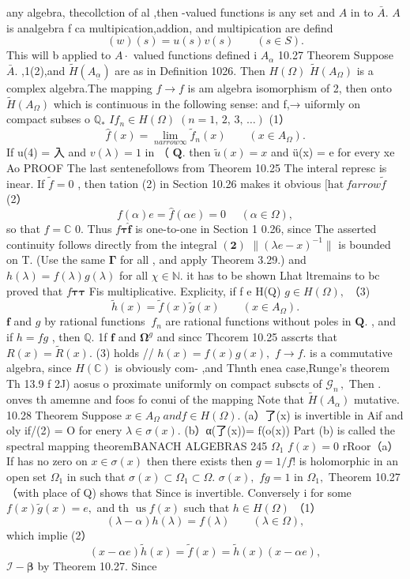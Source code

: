any algebra, thecollction of al ,then -valued functions is any set and $\textstyle A$ in to ${\bar{A}}.$ $\textstyle A$ is analgebra f ca multipication,addion, and multipication are defind $$ (w)(s)=u(s)v(s)\qquad(s\in S). $$ This will b applied to $A\!\cdot\!$ valued functions defined i $\scriptstyle A_{\alpha}$ 10.27 Theorem Suppose ${\bar{A}}.$ ,1(2),and ${\widetilde{H}}(A_{\underline{{{\alpha}}}})$ are as in Definition 1026. Then $H(\Omega)$ ${\tilde{H}}(A_{\Omega})$ is a complex algebra.The mapping $f\to f$ is am algebra isomorphism of 2, then onto ${\tilde{H}}(A_{\Omega})$ which is continuous in the following sense: and f,→ uiformly on compact subses o $\mathbb{Q}_{*}$ $I f_{n}\in H(\Omega)\;(n=1,\,2,\,3,\,\ldots)$ (1） $$ \hat{f}(x)=\operatorname*{lim}_{n arrow\infty}\tilde{f}_{n}(x)\qquad(x\in A_{\Omega}). $$ If u(4) = 入 and $v(\lambda)=1$ in （ $\mathbf{Q}.$ then ${\tilde{u}}(x)=x$ and ü(x) = e for every xe Ao PROOF The last sentenefollows from Theorem 10.25 The interal represc is inear. If ${\tilde{f}}=0$ , then tation (2) in Section 10.26 makes it obvious $\mathrm{[hat~}f arrow{\tilde{f}}$ (2） $$ f(\alpha)e=\hat{f}(\alpha e)=0~~~~~~(\alpha\in\Omega), $$ so that $f=\mathbb{C}$ 0. Thus $f{\boldsymbol{\tau}}{\boldsymbol{\hat{f}}}$ is one-to-one in Section 1 0.26, since The asserted continuity follows directly from the integral $\mathbf{(2)}$ $\|(\lambda e-x)^{-1}\|$ is bounded on T. (Use the same $\boldsymbol{\Gamma}$ for all , and apply Theorem 3.29.) and $h(\lambda)=f(\lambda)g(\lambda)$ for all $\scriptstyle\chi\in\mathbb{N}.$ it has to be shown Lhat ltremains to bc proved that $f{\boldsymbol{\tau}}{\boldsymbol{\tau}}$ Fis multiplicative. Explicity, if f e H(Q) $g\in H(\Omega),$ （3) $$ \tilde{h}(x)=\tilde{f}(x)\tilde{g}(x)\qquad(x\in A_{\Omega}). $$ $\boldsymbol{f}$ and $\boldsymbol{\mathit{g}}$ by rational functions $\ f_{n}$ are rational functions without poles in $\mathbf{Q}.$ , and if $h=f g$ , then $\mathbb{Q}.$ 1f $\boldsymbol{f}$ and $\mathbf{\Omega}^{g}$ and sincc Thcorem 10.25 asscrts that $R(x)=\tilde{R}(x).$ (3) holds // $h(x)=f(x)g(x),$ $\scriptstyle f\to f.$ is a commutative algebra, since $H(\mathbb{C})$ is obviously com- ,and Thnth enea case,Runge's theorem Th 13.9 f 2J) aosus o proximate uniformly on compact subscts of ${\mathcal{G}}_{n}\,,$ Then . onves th amemne and foos fo conui of the mapping Note that ${\widetilde{H}}(A_{\alpha})$ mutative. 10.28 Theorem Suppose $x\in A_{\Omega}\;a n d f\in H(\Omega).$ (a）了(x) is invertible in Aif and oly if/(2) = O for enery $\lambda\in\sigma(x).$ (b）α(了(x))= f(o(x)) Part (b) is called the spectral mapping theoremBANACH ALGEBRAS 245 $\Omega_{1}$ $f(x)=0$ rRoor（a）If has no zero on $x\in\sigma(x)$ then there exists then $g=1/f!$ is holomorphic in an open set $\Omega_{1}$ in such that $\sigma(x)\subset\Omega_{1}\subset\Omega.$ $\sigma(x),$ $f g=1$ in $\Omega_{1},$ Theorem 10.27（with place of Q) shows that Since is invertible. Conversely i for some $f(x){\widetilde{g}}(x)=e,$ and th $\operatorname{us}f(x)$ such that $h\in H(\Omega)$ （1） $$ (\lambda-\alpha)h(\lambda)=f(\lambda)\qquad(\lambda\in\Omega), $$ which implie (2） $$ (x-\alpha e)\tilde{h}(x)=\tilde{f}(x)=\tilde{h}(x)(x-\alpha e), $$ ${\mathcal{I}}-{\boldsymbol{\beta}}$ by Theorem 10.27. Since 